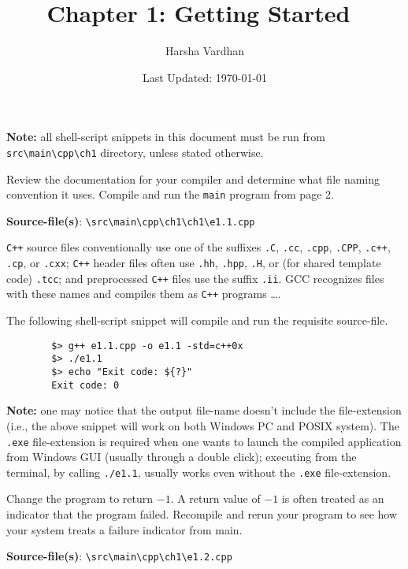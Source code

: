 \documentclass[12pt, a4paper]{article}
\begin{document}
    \title{Chapter 1: Getting Started~\cite{cpp-primer}}
    \author{Harsha Vardhan}
    \date{Last Updated: \today}

    \maketitle
    \bigskip

    \noindent\textbf{Note:} all shell-script snippets in this document must be run from \texttt{src\textbackslash main\textbackslash cpp\textbackslash ch1} directory, unless stated otherwise.
    \bigskip

    \begin{tcolorbox}[title={Exercise: 1.1}]
        Review the documentation for your compiler and determine what file naming convention it uses.
        Compile and run the \texttt{main} program from page 2.
    \end{tcolorbox}
    \noindent\textbf{Source-file(s)}: \texttt{\textbackslash src\textbackslash main\textbackslash cpp\textbackslash ch1\textbackslash ch1\textbackslash e1.1.cpp}

    \noindent \texttt{C++} source files conventionally use one of the suffixes \texttt{.C}, \texttt{.cc}, \texttt{.cpp}, \texttt{.CPP}, \texttt{.c++}, \texttt{.cp}, or \texttt{.cxx}; \texttt{C++} header files often use \texttt{.hh}, \texttt{.hpp}, \texttt{.H}, or (for shared template code) \texttt{.tcc}; and preprocessed \texttt{C++} files use the suffix \texttt{.ii}.
    GCC recognizes files with these names and compiles them as \texttt{C++} programs \dots \cite{gcc-manpage}.

    \noindent The following shell-script snippet will compile and run the requisite source-file.
    \begin{verbatim}
        $> g++ e1.1.cpp -o e1.1 -std=c++0x
        $> ./e1.1
        $> echo "Exit code: ${?}"
        Exit code: 0
    \end{verbatim}

    \noindent\textbf{Note:} one may notice that the output file-name doesn't include the file-extension (i.e., the above snippet will work on both Windows PC and POSIX system).
    The \texttt{.exe} file-extension is required when one wants to launch the compiled application from Windows GUI (usually through a double click); executing from the terminal, by calling \texttt{./e1.1}, usually works even without the \texttt{.exe} file-extension.

    \bigskip
    \begin{tcolorbox}[title={Exercise: 1.2}]
        Change the program to return $-1$.
        A return value of $-1$ is often treated as an indicator that the program failed.
        Recompile and rerun your program to see how your system treats a failure indicator from main.
    \end{tcolorbox}
    \noindent\textbf{Source-file(s)}: \texttt{\textbackslash src\textbackslash main\textbackslash cpp\textbackslash ch1\textbackslash e1.2.cpp}
\end{document}
